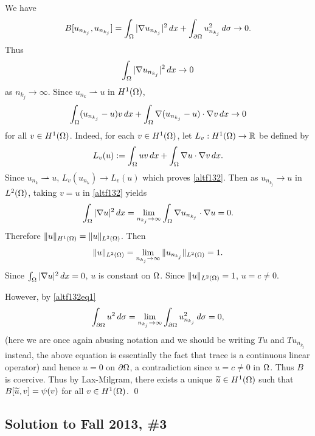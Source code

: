 We have
\begin{align}\label{altf132eq1}
B[u_{n_{k_{j}}}, u_{n_{k_{j}}}] = \int_{\Omega}|\nabla u_{n_{k_{j}}}|^{2}\, dx + \int_{\partial \Omega}u_{n_{k_{j}}}^{2}\, d\sigma \rightarrow 0.
\end{align}
Thus
$$\int_{\Omega}|\nabla u_{n_{k_{j}}}|^{2}\, dx \rightarrow 0$$
as $n_{k_{j}} \rightarrow \infty$.
Since $u_{n_{k}} \rightharpoonup u$ in $H^{1}(\Omega)$,
\begin{align}\label{altf132}
\int_{\Omega}(u_{n_{k_{j}}} - u)v\, dx + \int_{\Omega}\nabla(u_{n_{k_{j}}} - u)\cdot \nabla v\, dx \rightarrow 0
\end{align}
for all $v \in H^{1}(\Omega)$. Indeed, for each $v \in H^{1}(\Omega)$, let $L_{v} : H^{1}(\Omega) \rightarrow \mathbb{R}$ be defined by
$$L_{v}(u) := \int_{\Omega}uv\, dx + \int_{\Omega}\nabla u \cdot \nabla v\, dx.$$ Since $u_{n_{k}}\rightharpoonup u$, $L_{v}(u_{n_{k}}) \rightarrow L_{v}(u)$ which
proves \eqref{altf132}.
Then as $u_{n_{k_{j}}} \rightarrow u$ in $L^{2}(\Omega)$, taking $v = u$ in \eqref{altf132} yields
$$\int_{\Omega}|\nabla u|^{2}\, dx = \lim_{n_{k_{j}} \rightarrow \infty}\int_{\Omega}\nabla u_{n_{k_{j}}} \cdot \nabla u = 0.$$
Therefore $\| u \|_{H^{1}(\Omega)} = \| u \|_{L^{2}(\Omega)}$. Then
$$\| u \|_{L^{2}(\Omega)} = \lim_{n_{k_{j}} \rightarrow \infty}\| u_{n_{k_{j}}} \|_{L^{2}(\Omega)} = 1.$$
Since $\int_{\Omega}|\nabla u|^{2}\, dx = 0$, $u$ is constant on $\Omega$. Since $\|u\|_{L^{2}(\Omega)} = 1$, $u = c \neq 0$.

However, by \eqref{altf132eq1}
$$\int_{\partial \Omega}u^{2}\, d\sigma = \lim_{n_{k_{j}} \rightarrow \infty}\int_{\partial \Omega}u_{n_{k_{j}}}^{2}\, d\sigma = 0,$$
(here we are once again abusing notation and we should be writing $Tu$ and $Tu_{n_{k_{j}}}$ instead, the above equation is essentially
the fact that trace is a continuous linear operator) and hence $u = 0$ on $\partial \Omega$, a contradiction since $u = c \neq 0$ in $\Omega$.
Thus $B$ is coercive. Thus by Lax-Milgram, there exists a unique $\widetilde{u} \in H^{1}(\Omega)$ such that $B[\widetilde{u}, v] = \psi(v)$ for all $v \in H^{1}(\Omega)$.
\hfill\qed

\subsection*{Solution to Fall 2013, \#3}
\label{F13Q3}

